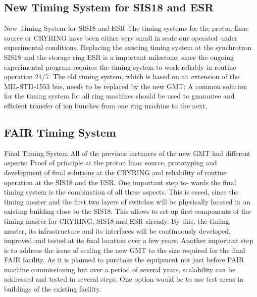 \subsection{New Timing System for SIS18 and ESR}

New Timing System for SIS18 and ESR The timing systems for 
the proton linac source or CRYRING have
been either very small in scale our operated under experimental conditions. 
Replacing the existing timing system
at the synchrotron SIS18 and the storage ring ESR is a important 
milestone, since the ongoing experimental program
requires the timing system to work reliably in routine operation 24/7. 
The old timing system, which is based on an extension of the MIL-STD-1553 bus, 
needs to be replaced by the new GMT: A common solution for the timing system 
for all ring machines should be used to guarantee and efficient transfer of 
ion bunches from one ring machine to the next.
 
\subsection{FAIR Timing System}
Final Timing System All of the previous instances of
the new GMT had different aspects: Proof of principle at
the proton linac source, prototyping and development of
final solutions at the CRYRING and reliability of routine
operation at the SIS18 and the ESR. One important step to-
wards the final timing system is the combination of all these
aspects. This is eased, since the timing master and the first
two layers of switches will be physically located in an existing 
building close to the SIS18. This allows to set up first
components of the timing master for CRYRING, SIS18 and
ESR already. By this, the timing master, its infrastructure
and its interfaces will be continuously developed, improved
and tested at its final location over a few years.
Another important step is to address the issue of scaling
the new GMT to the size required for the final FAIR facility. 
As it is planned to purchase the equipment not just
before FAIR machine commissioning but over a period of
several years, scalability can be addressed and tested in several steps. 
One option would be to use test areas in buildings of the existing facility.

